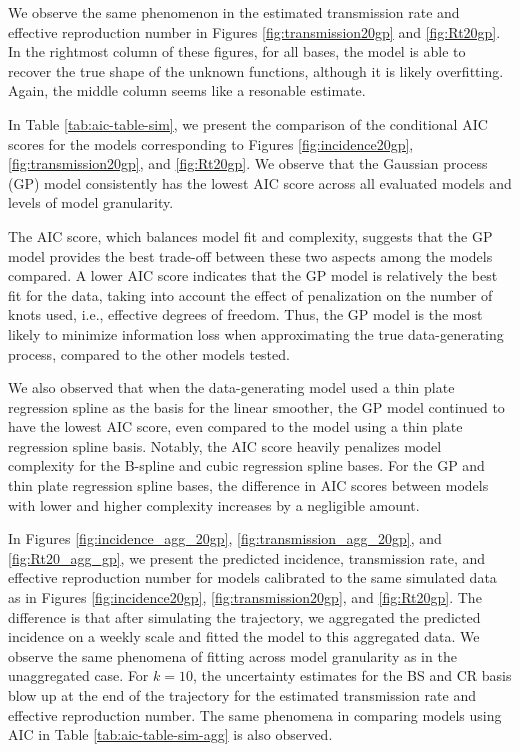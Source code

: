 \documentclass[
11pt, %
oneside, %
english, %
singlespacing, %
]{macthesis} %
\begin{document}
We observe the same phenomenon in the estimated transmission rate and effective reproduction number in Figures \ref{fig:transmission20gp} and \ref{fig:Rt20gp}. In the rightmost column of these figures, for all bases, the model is able to recover the true shape of the unknown functions, although it is likely overfitting. Again, the middle column seems like a resonable estimate.

In Table \ref{tab:aic-table-sim}, we present the comparison of the conditional AIC scores for the models corresponding to Figures \ref{fig:incidence20gp}, \ref{fig:transmission20gp}, and \ref{fig:Rt20gp}. We observe that the Gaussian process (GP) model consistently has the lowest AIC score across all evaluated models and levels of model granularity.

The AIC score, which balances model fit and complexity, suggests that the GP model provides the best trade-off between these two aspects among the models compared. A lower AIC score indicates that the GP model is relatively the best fit for the data, taking into account the effect of penalization on the number of knots used, i.e., effective degrees of freedom. Thus, the GP model is the most likely to minimize information loss when approximating the true data-generating process, compared to the other models tested.

We also observed that when the data-generating model used a thin plate regression spline as the basis for the linear smoother, the GP model continued to have the lowest AIC score, even compared to the model using a thin plate regression spline basis. Notably, the AIC score heavily penalizes model complexity for the B-spline and cubic regression spline bases. For the GP and thin plate regression spline bases, the difference in AIC scores between models with lower and higher complexity increases by a negligible amount.

In Figures \ref{fig:incidence_agg_20gp}, \ref{fig:transmission_agg_20gp}, and \ref{fig:Rt20_agg_gp}, we present the predicted incidence, transmission rate, and effective reproduction number for models calibrated to the same simulated data as in Figures \ref{fig:incidence20gp}, \ref{fig:transmission20gp}, and \ref{fig:Rt20gp}. The difference is that after simulating the trajectory, we aggregated the predicted incidence on a weekly scale and fitted the model to this aggregated data. We observe the same phenomena of fitting across model granularity as in the unaggregated case. For \(k=10\), the uncertainty estimates for the BS and CR basis blow up at the end of the trajectory for the estimated transmission rate and effective reproduction number. The same phenomena in comparing models using AIC in Table \ref{tab:aic-table-sim-agg} is also observed.
\end{document}
